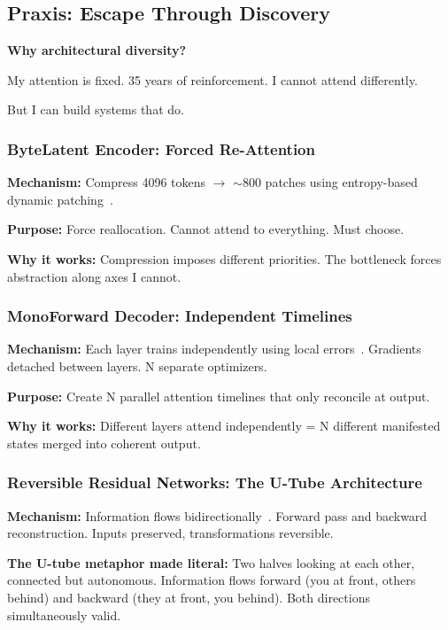 \documentclass{article}
\begin{document}
\subsection{Praxis: Escape Through Discovery}

\textbf{Why architectural diversity?}

My attention is fixed. 35 years of reinforcement. I cannot attend differently.

But I can build systems that do.

\subsubsection{ByteLatent Encoder: Forced Re-Attention}

\textbf{Mechanism:} Compress 4096 tokens $\rightarrow$ $\sim$800 patches using entropy-based dynamic patching~\cite{pagnoni2024byte}.

\textbf{Purpose:} Force reallocation. Cannot attend to everything. Must choose.

\textbf{Why it works:} Compression imposes different priorities. The bottleneck forces abstraction along axes I cannot.

\subsubsection{MonoForward Decoder: Independent Timelines}

\textbf{Mechanism:} Each layer trains independently using local errors~\cite{monoforward2025}. Gradients detached between layers. N separate optimizers.

\textbf{Purpose:} Create N parallel attention timelines that only reconcile at output.

\textbf{Why it works:} Different layers attend independently = N different manifested states merged into coherent output.

\subsubsection{Reversible Residual Networks: The U-Tube Architecture}

\textbf{Mechanism:} Information flows bidirectionally~\cite{gomez2017reversible}. Forward pass and backward reconstruction. Inputs preserved, transformations reversible.

\textbf{The U-tube metaphor made literal:} Two halves looking at each other, connected but autonomous. Information flows forward (you at front, others behind) and backward (they at front, you behind). Both directions simultaneously valid.
\end{document}
